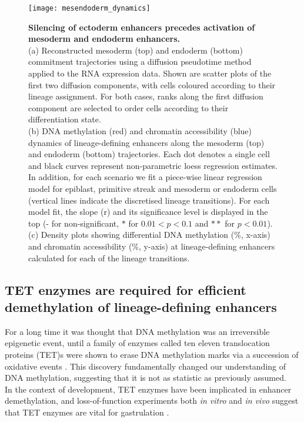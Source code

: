 \begin{figure}[]
	\centering
	\texttt{[image: mesendoderm\_dynamics]}
	\caption[]{
	\textbf{Silencing of ectoderm enhancers precedes activation of mesoderm and endoderm enhancers.} \\
	(a) Reconstructed mesoderm (top) and endoderm (bottom) commitment trajectories using a diffusion pseudotime method applied to the RNA expression data. Shown are scatter plots of the first two diffusion components, with cells coloured according to their lineage assignment. For both cases, ranks along the first diffusion component are selected to order cells according to their differentiation state. \\
	(b) DNA methylation (red) and chromatin accessibility (blue) dynamics of lineage-defining enhancers along the mesoderm (top) and endoderm (bottom) trajectories. Each dot denotes a single cell and black curves represent non-parametric loess regression estimates. In addition, for each scenario we fit a piece-wise linear regression model for epiblast, primitive streak and mesoderm or endoderm cells (vertical lines indicate the discretised lineage transitions). For each model fit, the slope (r) and its significance level is displayed in the top (- for non-significant, $*$ for $0.01<p<0.1$ and $**$ for $p<0.01$).\\
	(c) Density plots showing differential DNA methylation (\%, x-axis) and chromatin accessibility (\%, y-axis) at lineage-defining enhancers calculated for each of the lineage transitions.
	}
	\label{fig:mesendoderm_dynamics}
\end{figure}


\subsection{TET enzymes are required for efficient demethylation of lineage-defining enhancers}

For a long time it was thought that DNA methylation was an irreversible epigenetic event, until a family of enzymes called ten eleven translocation proteins (TET)s were shown to erase DNA methylation marks via a succession of oxidative events \cite{Rasmussen2016}. This discovery fundamentally changed our understanding of DNA methylation, suggesting that it is not as statistic as previously assumed.\\
In the context of development, TET enzymes have been implicated in enhancer demethylation, and loss-of-function experiments both \textit{in vitro} and \textit{in vivo} suggest that TET enzymes are vital for gastrulation \cite{Dai2016,Sardina2018,Rasmussen2016,Li2016}.

